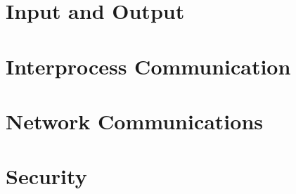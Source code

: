 \documentclass[12pt]{article}
\begin{document}
\section{Input and Output} %

\section{Interprocess Communication} %

\section{Network Communications} %

\section{Security} %
\end{document}
